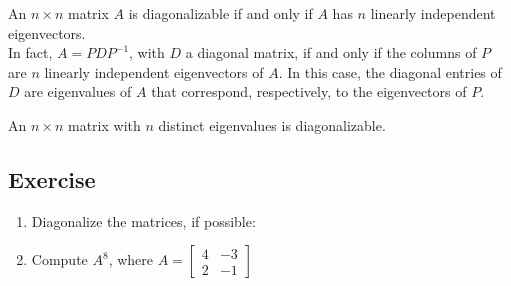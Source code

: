 \documentclass[aima104_lecturenotes_ku.tex]{subfiles}
\begin{document}
\setcounter{thm}{2}
\begin{thm}
  An $n \times n$ matrix $A$ is diagonalizable if and only if $A$ has $n$ linearly independent eigenvectors. \\
  In fact, $A = PDP^{-1}$, with $D$ a diagonal matrix, if and only if the columns of $P$ are $n$ linearly independent eigenvectors of $A$. In this case, the diagonal entries of $D$ are eigenvalues of $A$ that correspond, respectively, to the eigenvectors of $P$.
\end{thm}

\setcounter{theorem}{3}
\begin{theorem}
  An $n \times n$ matrix with $n$ distinct eigenvalues is diagonalizable.
\end{theorem}

\subsection{Exercise}
\begin{enumerate}
\item Diagonalize the matrices, if possible:
\begin{enumerate}[i).]

  \end{enumerate}

\item Compute $A^8$, where $A =
  \begin{bmatrix}
    4 & -3 \\
    2 & -1
  \end{bmatrix}$
\end{enumerate}
\end{document}
